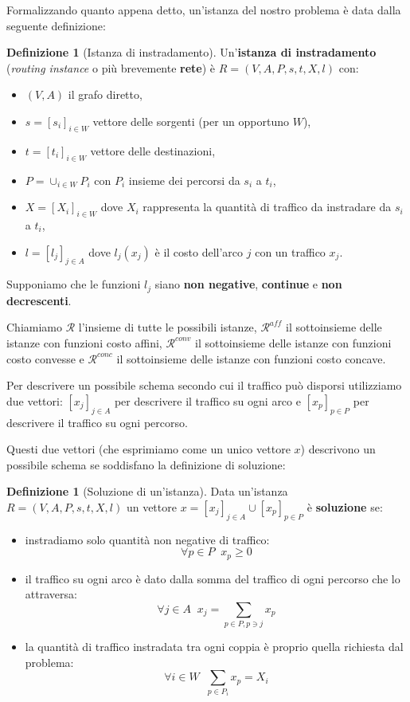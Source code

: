 \documentclass[a4paper]{article}
\theoremstyle{plain}
\theoremstyle{definition}
\newtheorem{mydef}[myteo]{Definizione}
\theoremstyle{remark}
\newcommand{\bra}[1]{\left[#1\right]}
\begin{document}
Formalizzando quanto appena detto, un'istanza del nostro problema è
data dalla seguente definizione:

\begin{mydef}[Istanza di instradamento]
  Un'\textbf{istanza di instradamento} (\textit{routing instance} o
  più brevemente \textbf{rete}) è $R=(V,A,P,s,t,X,l)$ con:
  \begin{itemize}
  \item $(V,A)$ il grafo diretto,
  \item $s = \bra{s_i}_{i\in W}$ vettore delle sorgenti (per un opportuno $W$),
  \item $t = \bra{t_i}_{i\in W}$ vettore delle destinazioni,
  \item $P = \cup _{i\in W} P_i$ con $P_i$ insieme dei
    percorsi da $s_i$ a $t_i$,
  \item $X = \bra{X_i}_{i\in W}$ dove $X_i$ rappresenta la quantità di
    traffico da instradare da $s_i$ a $t_i$,
  \item $l = \bra{l_j}_{j\in A}$ dove $l_j(x_j)$ è il costo dell'arco
    $j$ con un traffico $x_j$.
  \end{itemize}
  Supponiamo che le funzioni $l_j$ siano \textbf{non negative},
  \textbf{continue} e \textbf{non decrescenti}.
\end{mydef}

Chiamiamo $\mathcal{R}$ l'insieme di tutte le possibili istanze,
$\mathcal{R}^{aff}$ il sottoinsieme delle istanze con funzioni costo
affini, $\mathcal{R}^{conv}$ il sottoinsieme delle istanze con funzioni costo
convesse e $\mathcal{R}^{conc}$ il sottoinsieme delle istanze con
funzioni costo concave.

Per descrivere un possibile schema secondo cui il traffico può
disporsi utilizziamo due vettori: $\bra{x_j}_{j\in A}$ per descrivere
il traffico su ogni arco e $\bra{x_p}_{p\in P}$ per descrivere il
traffico su ogni percorso.

Questi due vettori (che esprimiamo come un unico vettore $x$)
descrivono un possibile schema se soddisfano la definizione di soluzione:

\begin{mydef}[Soluzione di un'istanza]
  Data un'istanza $R=(V,A,P,s,t,X,l)$ un vettore
  $x = \bra{x_j}_{j\in A} \cup \bra{x_p}_{p\in P}$ è \textbf{soluzione} se:
  \begin{itemize}
  \item instradiamo solo quantità non negative di traffico: \[ \forall p\in P\;\; x_p \ge 0\]
  \item il traffico su ogni arco è dato dalla somma del traffico di
    ogni percorso che lo attraversa: \[ \forall j\in A\;\; x_j = \sum_{p\in P,p\ni j} x_p\]
  \item la quantità di traffico instradata tra ogni coppia è proprio
    quella richiesta dal problema: \[\forall i\in W\;\; \sum_{p\in P_i} x_p = X_i\]
  \end{itemize}
\end{mydef}
\end{document}
